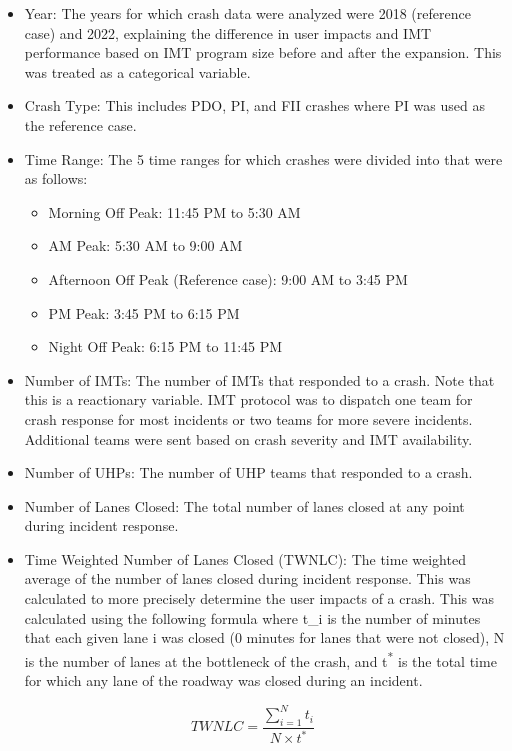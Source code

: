 \documentclass[
  letterpaper,
  authoryear]{elsarticle}
\begin{document}
\begin{itemize}
\item
  Year: The years for which crash data were analyzed were 2018
  (reference case) and 2022, explaining the difference in user impacts
  and IMT performance based on IMT program size before and after the
  expansion. This was treated as a categorical variable.
\item
  Crash Type: This includes PDO, PI, and FII crashes where PI was used
  as the reference case.
\item
  Time Range: The 5 time ranges for which crashes were divided into that
  were as follows:

  \begin{itemize}
  \item
    Morning Off Peak: 11:45 PM to 5:30 AM
  \item
    AM Peak: 5:30 AM to 9:00 AM
  \item
    Afternoon Off Peak (Reference case): 9:00 AM to 3:45 PM
  \item
    PM Peak: 3:45 PM to 6:15 PM
  \item
    Night Off Peak: 6:15 PM to 11:45 PM
  \end{itemize}
\item
  Number of IMTs: The number of IMTs that responded to a crash. Note
  that this is a reactionary variable. IMT protocol was to dispatch one
  team for crash response for most incidents or two teams for more
  severe incidents. Additional teams were sent based on crash severity
  and IMT availability.
\item
  Number of UHPs: The number of UHP teams that responded to a crash.
\item
  Number of Lanes Closed: The total number of lanes closed at any point
  during incident response.
\item
  Time Weighted Number of Lanes Closed (TWNLC): The time weighted
  average of the number of lanes closed during incident response. This
  was calculated to more precisely determine the user impacts of a
  crash. This was calculated using the following formula where t\_i is
  the number of minutes that each given lane i was closed (0 minutes for
  lanes that were not closed), N is the number of lanes at the
  bottleneck of the crash, and t\textsuperscript{*} is the total time
  for which any lane of the roadway was closed during an incident.
\end{itemize}

\[ TWNLC = \frac{\sum_{i=1}^{N}t_i}{N \times t^*}
\]
\end{document}
